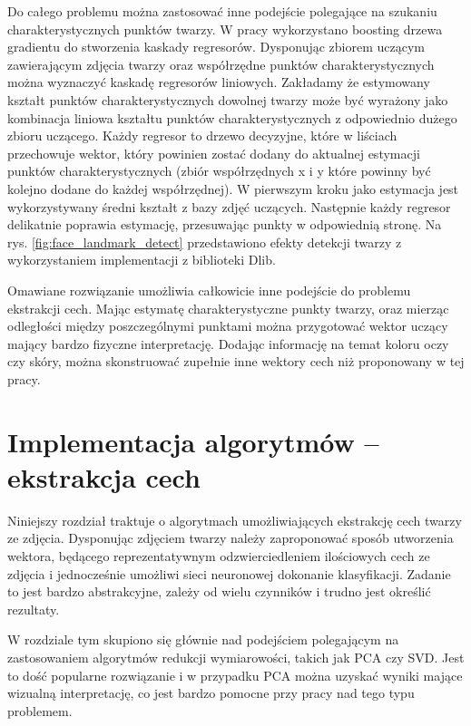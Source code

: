\documentclass[oneside, eng]{mgr}
\begin{document}
Do całego problemu można zastosować inne podejście polegające na szukaniu charakterystycznych punktów twarzy. W pracy \cite{Landmark face detector} wykorzystano boosting drzewa gradientu do stworzenia kaskady regresorów. Dysponując zbiorem uczącym zawierającym zdjęcia twarzy oraz współrzędne punktów charakterystycznych można wyznaczyć kaskadę regresorów liniowych. Zakładamy że estymowany kształt punktów charakterystycznych dowolnej twarzy może być wyrażony jako kombinacja liniowa kształtu punktów charakterystycznych z odpowiednio dużego zbioru uczącego. Każdy regresor to drzewo decyzyjne, które w liściach przechowuje wektor, który powinien zostać dodany do aktualnej estymacji punktów charakterystycznych (zbiór współrzędnych x i y które powinny być kolejno dodane do każdej współrzędnej). W pierwszym kroku jako estymacja jest wykorzystywany średni kształt z bazy zdjęć uczących. Następnie każdy regresor delikatnie poprawia estymację, przesuwając punkty w odpowiednią stronę. Na rys. \ref{fig:face_landmark_detect} przedstawiono efekty detekcji twarzy z wykorzystaniem implementacji z biblioteki Dlib.

Omawiane rozwiązanie umożliwia całkowicie inne podejście do problemu ekstrakcji cech. Mając estymatę charakterystyczne punkty twarzy, oraz mierząc odległości między poszczególnymi punktami można przygotować wektor uczący mający bardzo fizyczne interpretację. Dodając informację na temat koloru oczy czy skóry, można skonstruować zupełnie inne wektory cech niż proponowany w tej pracy. 

\newpage
 
\chapter{Implementacja algorytmów – ekstrakcja cech}

Niniejszy rozdział traktuje o algorytmach umożliwiających ekstrakcję cech twarzy ze zdjęcia. Dysponując zdjęciem twarzy należy zaproponować sposób utworzenia wektora, będącego reprezentatywnym odzwierciedleniem ilościowych cech ze zdjęcia i jednocześnie umożliwi sieci neuronowej dokonanie klasyfikacji. Zadanie to jest bardzo abstrakcyjne, zależy od wielu czynników i trudno jest określić rezultaty.

W rozdziale tym skupiono się głównie nad podejściem polegającym na zastosowaniem algorytmów redukcji wymiarowości, takich jak PCA czy SVD. Jest to dość popularne rozwiązanie i w przypadku PCA można uzyskać wyniki mające wizualną interpretację, co jest bardzo pomocne przy pracy nad tego typu problemem.
\end{document}
